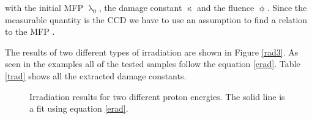 \noindent
with the initial \ac{MFP} $\uplambda_0$, the damage constant $\upkappa$ and the fluence $\upphi$. Since the measurable quantity is the \ac{CCD} we have to use an assumption to find a relation to the \ac{MFP} \cite{felix}.\par
The results of two different types of irradiation are shown in Figure \vref{rad3}. As seen in the examples all of the tested samples follow the equation \vref{erad}. Table \vref{trad} shows all the extracted damage constants.

\begin{figure}
	\centering
	\caption{Irradiation results for two different proton energies. The solid line is a fit using equation \vref{erad}.}
	\label{rad3}
\end{figure}


